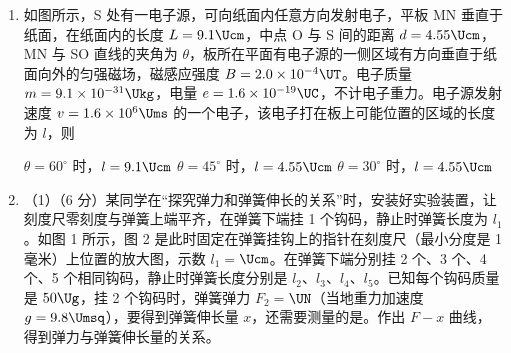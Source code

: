 \documentclass[\gkver]{gaokaozhenti}
\begin{document}
\begin{enumerate}
\item
如图所示，S 处有一电子源，可向纸面内任意方向发射电子，平板 MN 垂直于纸面，在纸面内的长度 $L=9.1\Ucm$，中点 O 与 S 间的距离 $d=4.55\Ucm$，MN 与 SO 直线的夹角为 $\theta$，板所在平面有电子源的一侧区域有方向垂直于纸面向外的匀强磁场，磁感应强度 $B=2.0\times10^{-4}\UT$。电子质量 $m=9.1\times10^{-31}\Ukg$，电量 $e=1.6\times10^{-19}\UC$，不计电子重力。电子源发射速度 $v=1.6\times10^{6}\Ums$ 的一个电子，该电子打在板上可能位置的区域的长度为 $l$，则


{$\theta=60^\circ$ 时，$l=9.1\Ucm$}
{$\theta=45^\circ$ 时，$l=4.55\Ucm$}
{$\theta=30^\circ$ 时，$l=4.55\Ucm$}


\item
（1）（6 分）某同学在“探究弹力和弹簧伸长的关系”时，安装好实验装置，让刻度尺零刻度与弹簧上端平齐，在弹簧下端挂 1 个钩码，静止时弹簧长度为 $l_{1}$。如图 1 所示，图 2 是此时固定在弹簧挂钩上的指针在刻度尺（最小分度是 1 毫米）上位置的放大图，示数 $l_{1}=$$\Ucm$。在弹簧下端分别挂 2 个、3 个、4 个、5 个相同钩码，静止时弹簧长度分别是 $l_{2}$、$l_{3}$、$l_{4}$、$l_{5}$。已知每个钩码质量是 $50\Ug$，挂 2 个钩码时，弹簧弹力 $F_{2}=$$\UN$（当地重力加速度 $g=9.8\Umsq$），要得到弹簧伸长量 $x$，还需要测量的是。作出 $F-x$ 曲线，得到弹力与弹簧伸长量的关系。


\end{enumerate}
\end{document}
